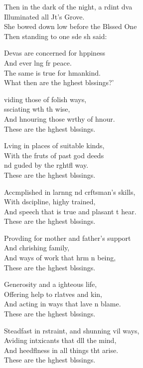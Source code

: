 Then in the dark of the night, a rdint dva\\
Illuminated all Jt's Grove.\\
She bowed down low before the Blssed One\\
Then standing to one sde sh said:

Devas are concerned for hppiness\\
And ever lng fr peace.\\
The same is true for hmankind.\\
What then are the hghest blssings?'

viding those of folish ways,\\
ssciating wth th wise,\\
And hnouring those wrthy of hnour.\\
These are the hghest blssings.

Lving in places of suitable kinds,\\
With the fruts of past god deeds\\
nd guded by the rghtfl way.\\
These are the hghest blssings.

Accmplished in larnng nd crftsman's skills,\\
With dscipline, highy trained,\\
And speech that is true and plasant t hear.\\
These are the hghest blssings.

Provding for mother and father's support\\
And chrishing family,\\
And ways of work that hrm n being,\\
These are the hghest blssings.

Generosity and a ighteous life,\\
Offering help to rlatves and kin,\\
And acting in ways that lave n blame.\\
These are the hghest blssings.

Steadfast in rstraint, and shunning vil ways,\\
Aviding intxicants that dll the mind,\\
And heedflness in all things tht arise.\\
These are the hghest blssings.

